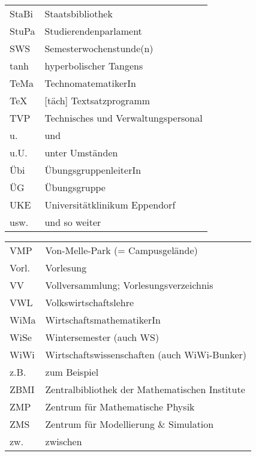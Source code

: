 \begin{tabular}{|p{10mm} p{68mm}|}
StaBi  	& Staatsbibliothek \\
StuPa   & Studierendenparlament \\
SWS    	& Semesterwochenstunde(n) \\
tanh   	& hyperbolischer Tangens \\
TeMa   	& TechnomatematikerIn \\
\TeX   	& [täch] Textsatzprogramm \\
TVP    	& Technisches und Verwaltungspersonal \\
u.     	& und \\
u.U.   	& unter Umständen \\
Übi   	& ÜbungsgruppenleiterIn \\
ÜG			& Übungsgruppe \\
UKE    	& Universitätklinikum Eppendorf \\
usw.   	& und so weiter \\
\hline
\end{tabular}

\begin{tabular}{|p{10mm} p{68mm}|}
\hline
VMP    	& Von-Melle-Park (= Campusgelände) \\
Vorl.		& Vorlesung \\
VV     	& Vollversammlung; Vorlesungsverzeichnis \\
VWL    	& Volkswirtschaftslehre \\
WiMa   	& WirtschaftsmathematikerIn \\
WiSe   	& Wintersemester (auch WS) \\
WiWi   	& Wirtschaftswissenschaften (auch WiWi-Bunker) \\
z.B.   	& zum Beispiel \\
ZBMI   	& Zentralbibliothek der Mathematischen Institute\\
ZMP			& Zentrum für Mathematische Physik \\
ZMS    	& Zentrum für Modellierung \& Simulation \\
zw.    	& zwischen \\
\hline
\end{tabular}

